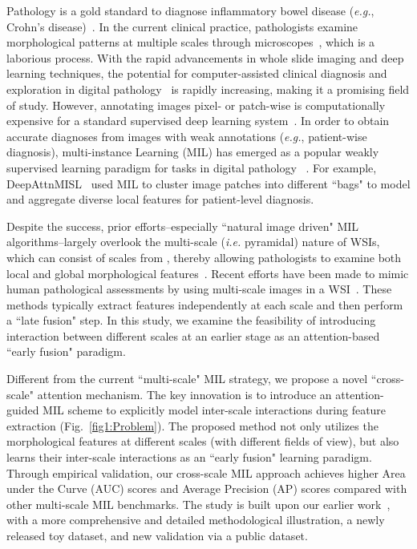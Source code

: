 \documentclass[times,twocolumn,final]{elsarticle}
\begin{document}
Pathology is a gold standard to diagnose inflammatory bowel disease (\textit{e.g.}, Crohn's disease)~\citep{gubatan2021artificial,yeshi2020revisiting}. In the current clinical practice, pathologists examine morphological patterns at multiple scales through microscopes~\citep{bejnordi2017diagnostic}, which is a laborious process. With the rapid advancements in whole slide imaging and deep learning techniques, the potential for computer-assisted clinical diagnosis and exploration in digital pathology~\citep{kraszewski2021machine,con2021deep,kiyokawa2022deep,syed2020potential}  is rapidly increasing, making it a promising field of study. However, annotating images pixel- or patch-wise is computationally expensive for a standard supervised deep learning system~\citep{hou2016patch,mousavi2015automated,maksoud2020sos,dimitriou2019deep}. In order to obtain accurate diagnoses from images with weak annotations (\textit{e.g.}, patient-wise diagnosis), multi-instance Learning (MIL) has emerged as a popular weakly supervised learning paradigm for tasks in digital pathology ~\citep{wang2019rmdl,skrede2020deep,chen2021aminn,lu2021data,lu2021ai}. For example, DeepAttnMISL~\citep{yao2020whole} used MIL to cluster image patches into different ``bags" to model and aggregate diverse local features for patient-level diagnosis.

Despite the success, prior efforts--especially ``natural image driven" MIL algorithms--largely overlook the multi-scale (\textit{i.e.} pyramidal) nature of WSIs, which can consist of scales from , thereby allowing pathologists to examine both local and global morphological features~\citep{bejnordi2015multi,gao2016multi,tokunaga2019adaptive}. Recent efforts have been made to mimic human pathological assessments by using multi-scale images in a WSI~\citep{Hashimoto_2020_CVPR,Li_2021_CVPR}. These methods typically extract features independently at each scale and then perform a ``late fusion" step. In this study, we examine the feasibility of introducing interaction between different scales at an earlier stage as an attention-based ``early fusion" paradigm.


Different from the current ``multi-scale" MIL strategy, we propose a novel ``cross-scale" attention mechanism. The key innovation is to introduce an attention-guided MIL scheme to explicitly model inter-scale interactions during feature extraction (Fig.~\ref{fig1:Problem}). The proposed method not only utilizes the morphological features at different scales (with different fields of view), but also learns their inter-scale interactions as an ``early fusion" learning paradigm. Through empirical validation, our cross-scale MIL approach achieves higher Area under the Curve (AUC) scores and Average Precision (AP) scores compared with other multi-scale MIL benchmarks. The study is built upon our earlier work~\citep{deng2022cross}, with a more comprehensive and detailed methodological illustration, a newly released toy dataset, and new validation via a public dataset.
\end{document}
